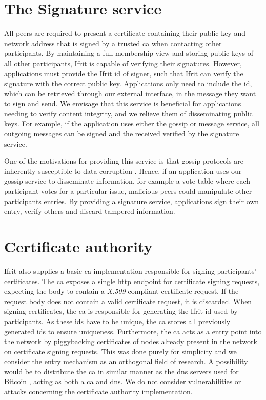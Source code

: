 \documentclass[USenglish]{uit-thesis}
\begin{document}
 
 
\section{The Signature service}
All peers are required to present a certificate containing their public key and network address that is signed by a trusted \gls{ca} when contacting other participants.
By maintaining a full membership view and storing public keys of all other participants, Ifrit is capable of verifying their signatures.
However, applications must provide the Ifrit id of signer, such that Ifrit can verify the signature with the correct public key.
Applications only need to include the id, which can be retrieved through our external interface, in the message they want to sign and send.
We envisage that this service is beneficial for applications needing to verify content integrity, and we relieve them of disseminating public keys. 
For example, if the application uses either the gossip or message service, all outgoing messages can be signed and the received verified by the signature service.

One of the motivations for providing this service is that gossip protocols are inherently susceptible to data corruption \cite{gossip_promise}.
Hence, if an application uses our gossip service to disseminate information, for example a vote table where each participant votes for a particular issue, malicious peers could manipulate other participants entries.
By providing a signature service, applications sign their own entry, verify others and discard tampered information.
 
   

\section{Certificate authority}
Ifrit also supplies a basic \gls{ca} implementation responsible for signing participants' certificates.
The \gls{ca} exposes a single \gls{http} endpoint for certificate signing requests, expecting the body to contain a \textit{X.509} compliant certificate request.
If the request body does not contain a valid certificate request, it is discarded.
When signing certificates, the \gls{ca} is responsible for generating the Ifrit id used by participants.
As these ids have to be unique, the \gls{ca} stores all previously generated ids to ensure uniqueness.
Furthermore, the \gls{ca} acts as a entry point into the network by piggybacking certificates of nodes already present in the network on certificate signing requests. 
This was done purely for simplicity and we consider the entry mechanism as an orthogonal field of research.  
A possibility would be to distribute the \gls{ca} in similar manner as the \gls{dns} servers used for Bitcoin \cite{propa}, acting as both a \gls{ca} and \gls{dns}. 
We do not consider vulnerabilities or attacks concerning the certificate authority implementation.
\end{document}
